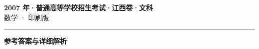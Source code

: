 \documentclass[zihao=5, a4paper]{ctexart}
\begin{document}
\begin{center}
  {\Large\bfseries 2007 年·普通高等学校招生考试·江西卷·文科}\\[4pt]
  {\large 数学 · 印刷版}
\end{center}
\medskip
{}

\par\bigskip\hrule\bigskip
{}
\begin{center}{\large\bfseries 参考答案与详细解析}\end{center}
\smallskip

\end{document}
